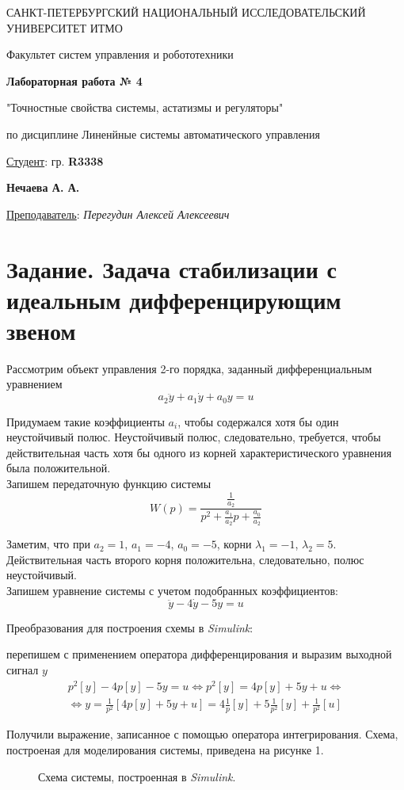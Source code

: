 \documentclass[a5paper, 10pt]{article}
\theoremstyle{definition}
\theoremstyle{plain}
\theoremstyle{remark}
\newcommand*{\titlePage}{
	\thispagestyle{title}
	\begingroup
	\begin{center}
		\vspace*{6ex}
		
		{\small
			САНКТ-ПЕТЕРБУРГСКИЙ НАЦИОНАЛЬНЫЙ ИССЛЕДОВАТЕЛЬСКИЙ УНИВЕРСИТЕТ ИТМО	
		}
		
		\vspace*{2ex}
		
		{\normalsize
			Факультет систем управления и робототехники
		}
		
		\vspace*{15ex}
		
		{\Large \bfseries 
			Лабораторная работа № 4
		}
\vspace*{2ex}
	{\Large \bfseries 
			
"Точностные свойства системы, астатизмы и регуляторы"
		}
\vspace*{2ex}
		
		{\normalsize
			по дисциплине Линенйные системы автоматического управления
		}

	\end{center}
	\vspace*{20ex}
	\begin{flushright}
		{\large 
			\underline{Студент}: гр. \textbf{R3338}\\
			\begin{flushright}
				\textbf{Нечаева А. А.}\\
			\end{flushright}
		}
		
		\vspace*{5ex}
		
		{\large 
			\underline{Преподаватель}: \textit{Перегудин Алексей Алексеевич}
		}
	\end{flushright}	
	\newpage
	\setcounter{page}{1}
	\endgroup}
\begin{document}
	\titlePage
	\pagestyle{style}
\newpage


\section{Задание. Задача стабилизации с идеальным дифференцирующим звеном}

Рассмотрим объект управления 2-го порядка, заданный дифференциальным уравнением
\begin{equation}
a_2 \ddot{y} + a_1 \dot{y} + a_0 y = u
\end{equation}

Придумаем такие коэффициенты $a_i$, чтобы содержался хотя бы один неустойчивый полюс. Неустойчивый полюс, следовательно, требуется, чтобы действительная часть хотя бы одного из корней характеристического уравнения была положительной.\\

Запишем передаточную функцию системы
\begin{equation}
W(p) = \frac{\frac{1}{a_2}}{p^2 + \frac{a_1}{a_2}p +  \frac{a_0}{a_2}}
\end{equation}

Заметим, что при $a_2 = 1$, $a_1 = -4$, $a_0 = -5$, корни $\lambda_1 = -1$, $\lambda_2 = 5$. Действительная часть второго корня положительна, следовательно, полюс неустойчивый.\\

Запишем уравнение системы с учетом подобранных коэффициентов:
\begin{equation}
 \ddot{y} -4 \dot{y} -5 y = u
\end{equation}

Преобразования для построения схемы в \textit{Simulink}:

перепишем с применением оператора дифференцирования и выразим выходной сигнал $y$
\begin{multline}
p^2[y] - 4p[y] - 5y = u \Leftrightarrow p^2[y] = 4p[y] + 5y + u \Leftrightarrow \\ \Leftrightarrow y = \frac{1}{p^2} \left[ 4p[y] + 5y + u  \right] =
4 \frac{1}{p} [y] + 5 \frac{1}{p^2} [y] + \frac{1}{p^2} [u]
\end{multline}

Получили выражение, записанное с помощью оператора интегрирования. Схема, построеная для моделирования системы, приведена на рисунке 1.

\begin{figure}[h!]
\caption{Схема системы, построенная в \textit{Simulink}.}
\end{figure}
\end{document}
